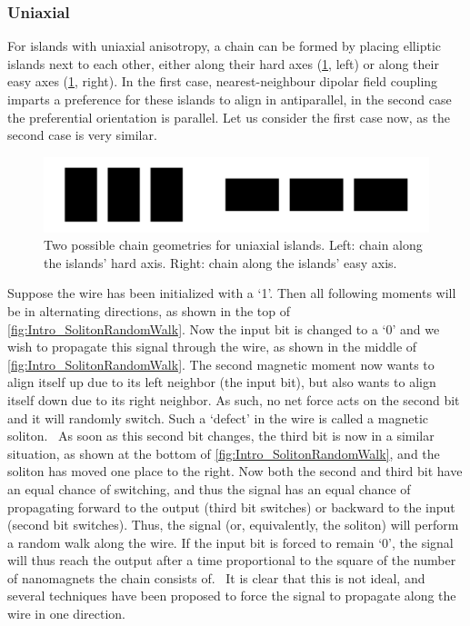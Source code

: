 \documentclass[12pt,a4paper]{article}
\begin{document}
\subsubsection{Uniaxial}
For islands with uniaxial anisotropy, a chain can be formed by placing elliptic islands next to each other, either along their hard axes (\cref{fig:Intro_IslandEllipticChainGeometries}, left) or along their easy axes (\cref{fig:Intro_IslandEllipticChainGeometries}, right). In the first case, nearest-neighbour dipolar field coupling imparts a preference for these islands to align in antiparallel, in the second case the preferential orientation is parallel. Let us consider the first case now, as the second case is very similar. %
\begin{figure}
    \centering
    \includegraphics[width=0.5\columnwidth]{Figures/Introduction/Chains_geometries.pdf}
    \caption{Two possible chain geometries for uniaxial islands. Left: chain along the islands' hard axis. Right: chain along the islands' easy axis.}
    \label{fig:Intro_IslandEllipticChainGeometries}
\end{figure}
Suppose the wire has been initialized with a `1'. Then all following moments will be in alternating directions, as shown in the top of \cref{fig:Intro_SolitonRandomWalk}. Now the input bit is changed to a `0' and we wish to propagate this signal through the wire, as shown in the middle of \cref{fig:Intro_SolitonRandomWalk}. The second magnetic moment now wants to align itself up due to its left neighbor (the input bit), but also wants to align itself down due to its right neighbor. As such, no net force acts on the second bit and it will randomly switch. Such a `defect' in the wire is called a magnetic soliton.~\cite{MQCA_RoomTemp} As soon as this second bit changes, the third bit is now in a similar situation, as shown at the bottom of \cref{fig:Intro_SolitonRandomWalk}, and the soliton has moved one place to the right. Now both the second and third bit have an equal chance of switching, and thus the signal has an equal chance of propagating forward to the output (third bit switches) or backward to the input (second bit switches). Thus, the signal (or, equivalently, the soliton) will perform a random walk along the wire. If the input bit is forced to remain `0', the signal will thus reach the output after a time proportional to the square of the number of nanomagnets the chain consists of.~\cite{Wolfram_RandomWalk} It is clear that this is not ideal, and several techniques have been proposed to force the signal to propagate along the wire in one direction. 
\end{document}
